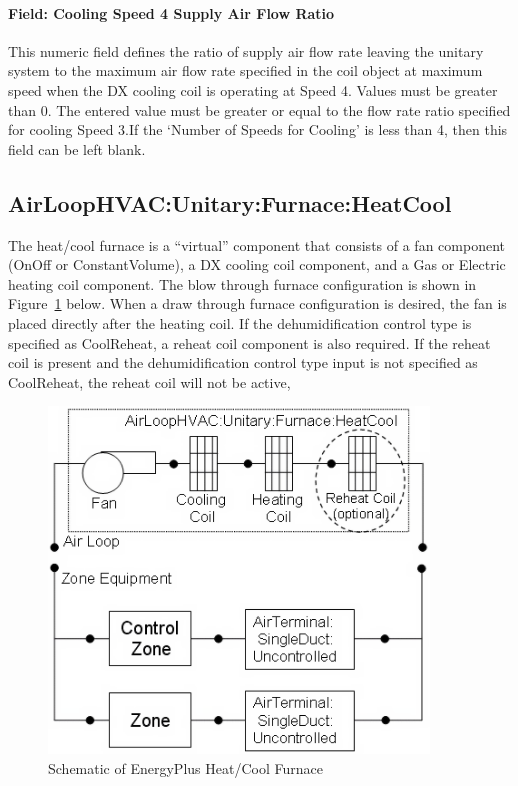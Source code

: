 \paragraph{Field: Cooling Speed 4 Supply Air Flow Ratio}\label{field-cooling-speed-4-supply-air-flow-ratio}

This numeric field defines the ratio of supply air flow rate leaving the unitary system to the maximum air flow rate specified in the coil object at maximum speed when the DX cooling coil is operating at Speed 4. Values must be greater than 0. The entered value must be greater or equal to the flow rate ratio specified for cooling Speed 3.If the `Number of Speeds for Cooling' is less than 4, then this field can be left blank.

\subsection{AirLoopHVAC:Unitary:Furnace:HeatCool}\label{airloophvacunitaryfurnaceheatcool}

The heat/cool furnace is a ``virtual'' component that consists of a fan component (OnOff or ConstantVolume), a DX cooling coil component, and a Gas or Electric heating coil component. The blow through furnace configuration is shown in Figure~\ref{fig:schematic-of-energyplus-heatcool-furnace} below. When a draw through furnace configuration is desired, the fan is placed directly after the heating coil. If the dehumidification control type is specified as CoolReheat, a reheat coil component is also required. If the reheat coil is present and the dehumidification control type input is not specified as CoolReheat, the reheat coil will not be active,

\begin{figure}[hbtp] %
\centering
\includegraphics[width=0.9\textwidth, height=0.9\textheight, keepaspectratio=true]{media/image298.png}
\caption{Schematic of EnergyPlus Heat/Cool Furnace \protect \label{fig:schematic-of-energyplus-heatcool-furnace}}
\end{figure}

